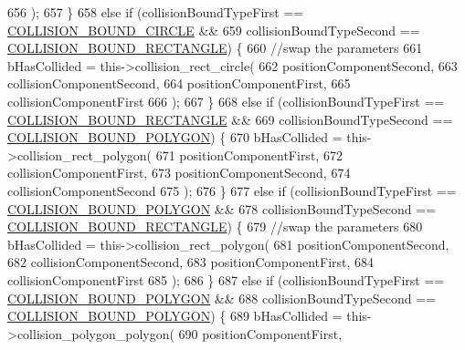 \begin{DoxyCode}
656                     );
657             \}
658             \textcolor{keywordflow}{else} \textcolor{keywordflow}{if} (collisionBoundTypeFirst == \hyperlink{_a_e___attributes_8h_a50b28a4aee049371f130f3eafa9c942f}{COLLISION\_BOUND\_CIRCLE} &&
659                 collisionBoundTypeSecond == \hyperlink{_a_e___attributes_8h_a3a31a6297a55375fdc090f881de08327}{COLLISION\_BOUND\_RECTANGLE}) \{
660                 \textcolor{comment}{//swap the parameters}
661                 bHasCollided = this->collision\_rect\_circle(
662                     positionComponentSecond,
663                     collisionComponentSecond,
664                     positionComponentFirst,
665                     collisionComponentFirst
666                     );
667             \}
668             \textcolor{keywordflow}{else} \textcolor{keywordflow}{if} (collisionBoundTypeFirst == \hyperlink{_a_e___attributes_8h_a3a31a6297a55375fdc090f881de08327}{COLLISION\_BOUND\_RECTANGLE} &&
669                 collisionBoundTypeSecond == \hyperlink{_a_e___attributes_8h_a71ab491ab7b44947b07d7b05974387d9}{COLLISION\_BOUND\_POLYGON}) \{
670                 bHasCollided = this->collision\_rect\_polygon(
671                     positionComponentFirst,
672                     collisionComponentFirst,
673                     positionComponentSecond,
674                     collisionComponentSecond
675                     );
676             \}
677             \textcolor{keywordflow}{else} \textcolor{keywordflow}{if} (collisionBoundTypeFirst == \hyperlink{_a_e___attributes_8h_a71ab491ab7b44947b07d7b05974387d9}{COLLISION\_BOUND\_POLYGON} &&
678                 collisionBoundTypeSecond == \hyperlink{_a_e___attributes_8h_a3a31a6297a55375fdc090f881de08327}{COLLISION\_BOUND\_RECTANGLE}) \{
679                     \textcolor{comment}{//swap the parameters}
680                 bHasCollided = this->collision\_rect\_polygon(
681                     positionComponentSecond,
682                     collisionComponentSecond,
683                     positionComponentFirst,
684                     collisionComponentFirst
685                     );
686             \}
687             \textcolor{keywordflow}{else} \textcolor{keywordflow}{if} (collisionBoundTypeFirst == \hyperlink{_a_e___attributes_8h_a71ab491ab7b44947b07d7b05974387d9}{COLLISION\_BOUND\_POLYGON} &&
688                 collisionBoundTypeSecond == \hyperlink{_a_e___attributes_8h_a71ab491ab7b44947b07d7b05974387d9}{COLLISION\_BOUND\_POLYGON}) \{
689                 bHasCollided = this->collision\_polygon\_polygon(
690                     positionComponentFirst,

\end{DoxyCode}
